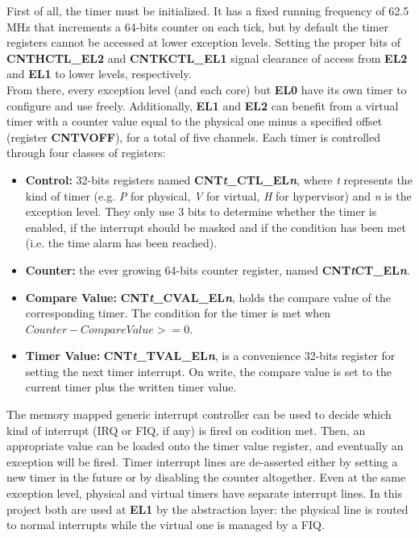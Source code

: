 \documentclass[12pt,a4paper,openright,twoside]{report}
\begin{document}
First of all, the timer must be initialized. It has a fixed running frequency
of 62.5 MHz that increments a 64-bits counter on each tick, but by default the 
timer registers cannot be accessed at lower 
exception levels. Setting the proper bits of \textbf{CNTHCTL\_EL2} 
and \textbf{CNTKCTL\_EL1} signal clearance of access from \textbf{EL2} 
and \textbf{EL1} to lower levels, respectively.\\

From there, every exception level (and each core) but \textbf{EL0} have its own timer to configure
and use freely. Additionally, \textbf{EL1} and \textbf{EL2} can benefit from a
virtual timer with a counter value equal to the physical one minus a 
specified offset (register \textbf{CNTVOFF}), for a total of five channels.
Each timer is controlled through four classes of registers:
\begin{itemize}
    \item \textbf{Control:} 32-bits registers named 
        \textbf{CNT\textit{t}\_CTL\_EL\textit{n}}, where \textit{t} represents the
        kind of timer (e.g. \textit{P} for physical, \textit{V} for virtual, 
        \textit{H} for hypervisor) and
        \textit{n} is the exception level. They only use 3 bits to determine whether
        the timer is enabled, if the interrupt should be masked and if the condition
        has been met (i.e. the time alarm has been reached).
    \item \textbf{Counter:} the ever growing 64-bits counter register, 
        named \textbf{CNT\textit{t}CT\_EL\textit{n}}.
    \item \textbf{Compare Value:} \textbf{CNT\textit{t}\_CVAL\_EL\textit{n}}, holds
        the compare value of the corresponding timer. The condition for the timer
        is met when $Counter - CompareValue >= 0$.
    \item \textbf{Timer Value:} \textbf{CNT\textit{t}\_TVAL\_EL\textit{n}}, is a
        convenience 32-bits register for setting the next timer interrupt. On write,
        the compare value is set to the current timer plus the written timer value.
\end{itemize}

The memory mapped generic interrupt controller can be used to decide which kind 
of interrupt (IRQ or FIQ, if any) is fired on codition met. Then, an appropriate
value can be loaded onto the timer value register, and eventually an exception will
be fired. Timer interrupt lines are de-asserted either by setting a new timer
in the future or by disabling the counter altogether.
Even at the same exception level, physical and virtual timers have separate interrupt 
lines. In this project both are used at \textbf{EL1} by the abstraction layer: 
the physical line is routed to normal interrupts while the virtual one is managed
by a FIQ.
\end{document}
